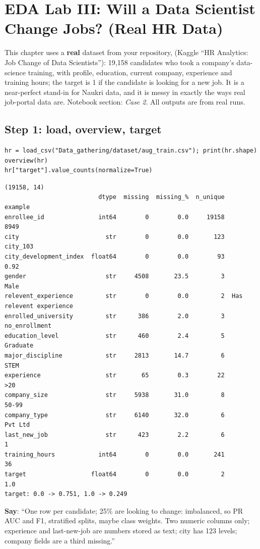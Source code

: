 \chapter{EDA Lab III: Will a Data Scientist Change Jobs? (Real HR Data)}

This chapter uses a \textbf{real} dataset from your repository,  (Kaggle ``HR Analytics: Job Change of Data
Scientists''): 19{,}158 candidates who took a company's data-science training, with profile, education, current company, experience and training hours; the target is 1 if the
candidate is looking for a new job. It is a near-perfect stand-in for Naukri data, and it is messy in exactly the ways real job-portal data are. Notebook section: \emph{Case 2}.
All outputs are from real runs.

\section{Step 1: load, overview, target}
\begin{lstlisting}
hr = load_csv("Data_gathering/dataset/aug_train.csv"); print(hr.shape)
overview(hr)
hr["target"].value_counts(normalize=True)
\end{lstlisting}
\outlabel
\begin{lstlisting}[style=out]
(19158, 14)
                          dtype  missing  missing_%  n_unique                  example
enrollee_id               int64        0        0.0     19158                     8949
city                        str        0        0.0       123                 city_103
city_development_index  float64        0        0.0        93                     0.92
gender                      str     4508       23.5         3                     Male
relevent_experience         str        0        0.0         2  Has relevent experience
enrolled_university         str      386        2.0         3            no_enrollment
education_level             str      460        2.4         5                 Graduate
major_discipline            str     2813       14.7         6                     STEM
experience                  str       65        0.3        22                      >20
company_size                str     5938       31.0         8                    50-99
company_type                str     6140       32.0         6                  Pvt Ltd
last_new_job                str      423        2.2         6                        1
training_hours            int64        0        0.0       241                       36
target                  float64        0        0.0         2                      1.0
target: 0.0 -> 0.751, 1.0 -> 0.249
\end{lstlisting}
\textbf{Say}: ``One row per candidate; 25\% are looking to change: imbalanced, so PR AUC and F1, stratified splits, maybe class weights. Two numeric columns only; experience and
last-new-job are numbers stored as text; city has 123 levels; company fields are a third missing.''

